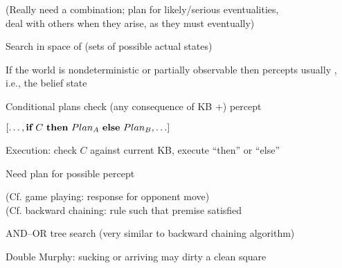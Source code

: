 \documentclass{article}
\newcommand{\condstep}[3]{\mbf{if}~#1~\mbf{then}~#2~\mbf{else}~#3}
\begin{document}
\begin{huge}
(Really need a combination; plan for likely/serious eventualities,\\
deal with others when they arise, as they must eventually)


       

Search in space of  (sets of possible actual states)

\textwidth
{}


If the world is nondeterministic or partially observable\al
  then percepts usually , \al
  i.e.,  the belief state

\vspace*{0.2in}

\textwidth
{}


Conditional plans check (any consequence of KB +) percept

$[\ldots,\condstep{C}{Plan_A}{Plan_B},\ldots]$

Execution: check $C$ against current KB, execute ``then'' or ``else''

Need  plan for  possible percept

(Cf. game playing:  response for  opponent move)\\
(Cf. backward chaining:  rule such that  premise satisfied

AND--OR tree search (very similar to backward chaining algorithm)



Double Murphy: sucking or arriving may dirty a clean square

\vspace*{0.2in}

\textwidth
{}



\end{huge}
\end{document}
